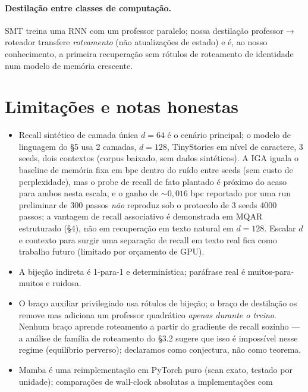 \documentclass[11pt]{article}
\begin{document}
\paragraph{Destila\c{c}\~ao entre classes de computa\c{c}\~ao.} SMT
\citep{kumar2026smt} treina uma RNN com um professor paralelo; nossa
destila\c{c}\~ao professor$\to$roteador transfere \emph{roteamento} (n\~ao
atualiza\c{c}\~oes de estado) e \'e, ao nosso conhecimento, a primeira
recupera\c{c}\~ao sem r\'otulos de roteamento de identidade num modelo de
mem\'oria crescente.

\section{Limita\c{c}\~oes e notas honestas}

\begin{itemize}
\item Recall sint\'etico de camada \'unica $d=64$ \'e o cen\'ario principal; o
  modelo de linguagem do \S5 usa 2 camadas, $d=128$, TinyStories em n\'ivel de
  caractere, 3 seeds, dois contextos (corpus baixado, sem dados sint\'eticos). A
  IGA iguala o baseline de mem\'oria fixa em bpc dentro do ru\'ido entre seeds
  (sem custo de perplexidade), mas o probe de recall de fato plantado \'e
  pr\'oximo do acaso para ambos nesta escala, e o ganho de $\sim$$0{,}016$ bpc
  reportado por uma run preliminar de 300 passos \emph{n\~ao} reproduz sob o
  protocolo de 3 seeds 4000 passos; a vantagem de recall associativo \'e
  demonstrada em MQAR estruturado (\S4), n\~ao em recupera\c{c}\~ao em texto
  natural em $d=128$. Escalar $d$ e contexto para surgir uma separa\c{c}\~ao de
  recall em texto real fica como trabalho futuro (limitado por
  or\c{c}amento de GPU).
\item A bije\c{c}\~ao indireta \'e 1-para-1 e determin\'istica; par\'afrase real
  \'e muitos-para-muitos e ruidosa.
\item O bra\c{c}o auxiliar privilegiado usa r\'otulos de bije\c{c}\~ao; o
  bra\c{c}o de destila\c{c}\~ao os remove mas adiciona um professor
  quadr\'atico \emph{apenas durante o treino}. Nenhum bra\c{c}o aprende roteamento
  a partir do gradiente de recall sozinho --- a an\'alise de fam\'ilia de
  roteamento do \S3.2 sugere que isso \'e imposs\'ivel nesse regime
  (equil\'ibrio perverso); declaramos como conjectura, n\~ao como teorema.
\item Mamba \'e uma reimplementa\c{c}\~ao em PyTorch puro (scan exato, testado por
  unidade); compara\c{c}\~oes de wall-clock absolutas a implementa\c{c}\~oes com
$$
\end{itemize}
\end{document}
